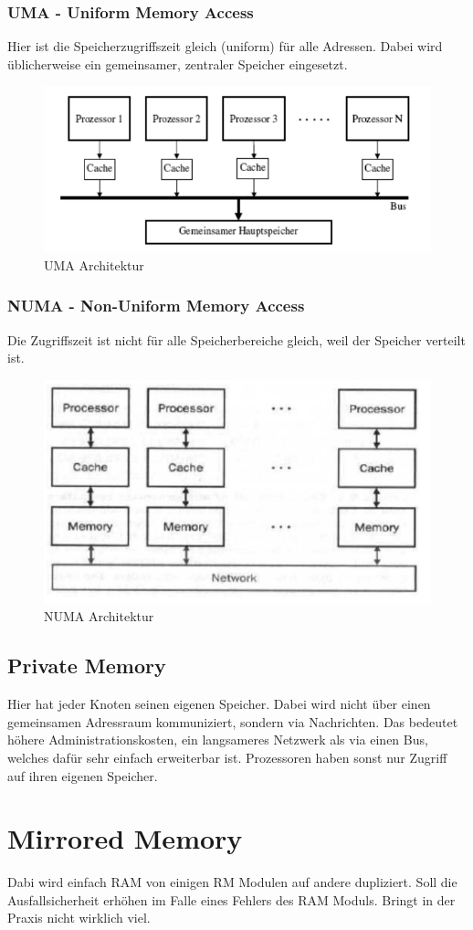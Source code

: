 \subsubsection{UMA - Uniform Memory Access}
Hier ist die Speicherzugriffszeit gleich (uniform) für alle Adressen. Dabei wird üblicherweise ein gemeinsamer, zentraler Speicher eingesetzt.
\begin{figure}
\centering
\includegraphics[width=0.7\linewidth]{fig/uma}
\caption{UMA Architektur}
\label{fig:uma}
\end{figure}
\subsubsection{NUMA - Non-Uniform Memory Access}
Die Zugriffszeit ist nicht für alle Speicherbereiche gleich, weil der Speicher verteilt ist.
\begin{figure}
\centering
\includegraphics[width=0.7\linewidth]{fig/numa}
\caption{NUMA Architektur}
\label{fig:numa}
\end{figure}
\subsection{Private Memory}
Hier hat jeder Knoten seinen eigenen Speicher. Dabei wird nicht über einen gemeinsamen Adressraum kommuniziert, sondern via Nachrichten. Das bedeutet höhere Administrationskosten, ein langsameres Netzwerk als via einen Bus, welches dafür sehr einfach erweiterbar ist.
Prozessoren haben sonst nur Zugriff auf ihren eigenen Speicher.

\section{Mirrored Memory}
Dabi wird einfach RAM von einigen RM Modulen auf andere dupliziert. Soll die Ausfallsicherheit erhöhen im Falle eines Fehlers des RAM Moduls. Bringt in der Praxis nicht wirklich viel.

